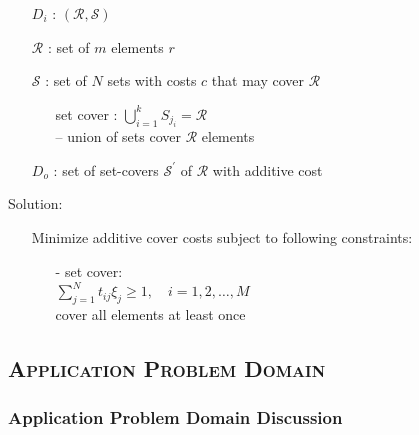 \documentclass[conference]{IEEEtran}
\begin{document}
\begin{enumerate}
  \item[] $D_i$ : $(\mathcal{R,S})$
  \item[] $\mathcal{R}$ : set of $m$ elements $r$
  \item[] $\mathcal{S}$ : set of $N$ sets with costs $c$ that may cover
    $\mathcal{R}$
    \begin{enumerate}
      \item[] set cover : $\bigcup\limits_{i=1}^k S_{j_i} =
        \mathcal{R}$~\cite[Eq.~3.12]{christofides1975}\\ 
        -- union of sets cover $\mathcal{R}$
        elements
    \end{enumerate}
  \item[] $D_o$ : set of set-covers $\mathcal{S}^\prime$ of $\mathcal{R}$ with
    additive cost
\end{enumerate}

Solution:
\begin{enumerate}
  \item[] Minimize additive cover costs subject to following constraints:
    \begin{enumerate}
      \item[-] set cover:\\
        $\sum\limits_{j=1}^N t_{ij} \xi_j \geq 1, \quad i =
        1,2,\ldots,M$~\cite[Eq.  3.14]{christofides1975}\\
        cover all elements at least once
    \end{enumerate}
\end{enumerate}




\subsection{\textsc{Application Problem Domain}} \label{sec:application}

\subsubsection{Application Problem Domain Discussion} \label{sec:APD}
\end{document}
